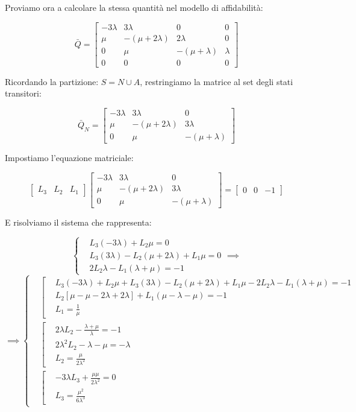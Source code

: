 Proviamo ora a calcolare la stessa quantità nel modello di affidabilità:

\[
	\bar{Q}=\begin{bmatrix}-3\lambda&3\lambda&0&0\\ \mu&-(\mu+2\lambda)&2\lambda&0\\0&\mu&-(\mu+\lambda)&\lambda\\0&0&0&0\end{bmatrix}
\]

Ricordando la partizione: $S=N\cup A$, restringiamo la matrice al set degli stati transitori:

\[	
	\bar{Q}_N = \begin{bmatrix}-3\lambda&3\lambda&0\\ \mu&-(\mu+2\lambda)&3\lambda\\0&\mu&-(\mu+\lambda)\end{bmatrix}
\]

Impostiamo l'equazione matriciale:

\[
	\begin{bmatrix}L_3&L_2&L_1\end{bmatrix}\begin{bmatrix}-3\lambda&3\lambda&0\\ \mu&-(\mu+2\lambda)&3\lambda\\0&\mu&-(\mu+\lambda)\end{bmatrix}=\begin{bmatrix}0&0&-1\end{bmatrix}
\]

E risolviamo il sistema che rappresenta:

\[
	\left\{
	\begin{aligned}
	&L_3(-3\lambda)+L_2\mu=0\\
	&L_3(3\lambda)-L_2(\mu+2\lambda)+L_1\mu=0\\
	&2L_2\lambda-L_1(\lambda+\mu)=-1
	\end{aligned}
	\right. \implies
\]
\[
	\implies \left\{
	\begin{aligned}
	&\left[
	\begin{aligned}
	&L_3(-3\lambda)+L_2\mu+L_3(3\lambda)-L_2(\mu+2\lambda)+L_1\mu-2L_2\lambda-L_1(\lambda+\mu)=-1\\
	&L_2[\mu-\mu-2\lambda+2\lambda] + L_1(\mu-\lambda-\mu)=-1\\
	&L_1=\frac{1}{\mu}
	\end{aligned}
	\right.\\
	&\left[
	\begin{aligned}
	&2\lambda L_2 -\frac{\lambda+\mu}{\lambda}=-1\\
	&2\lambda^2 L_2-\lambda-\mu=-\lambda\\
	&L_2=\frac{\mu}{2\lambda^2}
	\end{aligned}
	\right.\\
	&\left[
	\begin{aligned}
	&-3\lambda L_3 + \frac{\mu \mu}{2\lambda^2} = 0\\
	&L_3=\frac{\mu^2}{6\lambda^3}
	\end{aligned}
	\right.
	\end{aligned}
	\right.
\]

